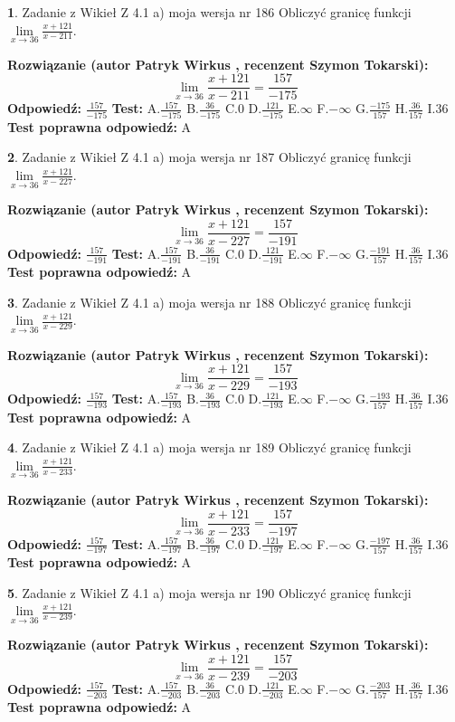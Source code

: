 \documentclass[12pt, a4paper]{article}
\theoremstyle{definition} %
\newtheorem{zad}{}
\newcommand{\zadStart}[1]{\begin{zad}#1\newline}
\newcommand{\zadStop}{\end{zad}}
\newcommand{\rozwStart}[2]{\noindent \textbf{Rozwiązanie (autor #1 , recenzent #2): }\newline}
\newcommand{\rozwStop}{\newline}
\newcommand{\odpStart}{\noindent \textbf{Odpowiedź:}\newline}
\newcommand{\odpStop}{\newline}
\newcommand{\testStart}{\noindent \textbf{Test:}\newline}
\newcommand{\testStop}{\newline}
\newcommand{\kluczStart}{\noindent \textbf{Test poprawna odpowiedź:}\newline}
\newcommand{\kluczStop}{\newline}
\begin{document}
\zadStart{Zadanie z Wikieł Z 4.1 a) moja wersja nr 186}
Obliczyć granicę funkcji $\lim\limits_{x\to36}\frac{x+121}{x-211}$.
\zadStop
\rozwStart{Patryk Wirkus}{Szymon Tokarski}
$$\lim\limits_{x\to36}\frac{x+121}{x-211} = \frac{157}{-175}$$
\rozwStop
\odpStart
$\frac{157}{-175}$
\odpStop
\testStart
A.$\frac{157}{-175}$
B.$\frac{36}{-175}$
C.$0$
D.$\frac{121}{-175}$
E.$\infty$
F.$-\infty$
G.$\frac{-175}{157}$
H.$\frac{36}{157}$
I.$36$
\testStop
\kluczStart
A
\kluczStop



\zadStart{Zadanie z Wikieł Z 4.1 a) moja wersja nr 187}
Obliczyć granicę funkcji $\lim\limits_{x\to36}\frac{x+121}{x-227}$.
\zadStop
\rozwStart{Patryk Wirkus}{Szymon Tokarski}
$$\lim\limits_{x\to36}\frac{x+121}{x-227} = \frac{157}{-191}$$
\rozwStop
\odpStart
$\frac{157}{-191}$
\odpStop
\testStart
A.$\frac{157}{-191}$
B.$\frac{36}{-191}$
C.$0$
D.$\frac{121}{-191}$
E.$\infty$
F.$-\infty$
G.$\frac{-191}{157}$
H.$\frac{36}{157}$
I.$36$
\testStop
\kluczStart
A
\kluczStop



\zadStart{Zadanie z Wikieł Z 4.1 a) moja wersja nr 188}
Obliczyć granicę funkcji $\lim\limits_{x\to36}\frac{x+121}{x-229}$.
\zadStop
\rozwStart{Patryk Wirkus}{Szymon Tokarski}
$$\lim\limits_{x\to36}\frac{x+121}{x-229} = \frac{157}{-193}$$
\rozwStop
\odpStart
$\frac{157}{-193}$
\odpStop
\testStart
A.$\frac{157}{-193}$
B.$\frac{36}{-193}$
C.$0$
D.$\frac{121}{-193}$
E.$\infty$
F.$-\infty$
G.$\frac{-193}{157}$
H.$\frac{36}{157}$
I.$36$
\testStop
\kluczStart
A
\kluczStop



\zadStart{Zadanie z Wikieł Z 4.1 a) moja wersja nr 189}
Obliczyć granicę funkcji $\lim\limits_{x\to36}\frac{x+121}{x-233}$.
\zadStop
\rozwStart{Patryk Wirkus}{Szymon Tokarski}
$$\lim\limits_{x\to36}\frac{x+121}{x-233} = \frac{157}{-197}$$
\rozwStop
\odpStart
$\frac{157}{-197}$
\odpStop
\testStart
A.$\frac{157}{-197}$
B.$\frac{36}{-197}$
C.$0$
D.$\frac{121}{-197}$
E.$\infty$
F.$-\infty$
G.$\frac{-197}{157}$
H.$\frac{36}{157}$
I.$36$
\testStop
\kluczStart
A
\kluczStop



\zadStart{Zadanie z Wikieł Z 4.1 a) moja wersja nr 190}
Obliczyć granicę funkcji $\lim\limits_{x\to36}\frac{x+121}{x-239}$.
\zadStop
\rozwStart{Patryk Wirkus}{Szymon Tokarski}
$$\lim\limits_{x\to36}\frac{x+121}{x-239} = \frac{157}{-203}$$
\rozwStop
\odpStart
$\frac{157}{-203}$
\odpStop
\testStart
A.$\frac{157}{-203}$
B.$\frac{36}{-203}$
C.$0$
D.$\frac{121}{-203}$
E.$\infty$
F.$-\infty$
G.$\frac{-203}{157}$
H.$\frac{36}{157}$
I.$36$
\testStop
\kluczStart
A
\kluczStop
\end{document}
